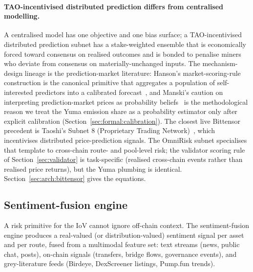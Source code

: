\documentclass[11pt,a4paper]{article}
\begin{document}
\paragraph{TAO-incentivised distributed prediction differs from centralised
modelling.} A centralised model has one objective and one bias surface; a TAO-incentivised
distributed prediction subnet has a stake-weighted ensemble that is economically
forced toward consensus on realised outcomes and is bonded to penalise miners who
deviate from consensus on materially-unchanged inputs. The mechanism-design lineage
is the prediction-market literature: Hanson's market-scoring-rule construction is
the canonical primitive that aggregates a population of self-interested predictors
into a calibrated forecast~\cite{hanson2003combinatorial}, and Manski's caution on
interpreting prediction-market prices as probability beliefs~\cite{manski2006interpreting}
is the methodological reason we treat the Yuma emission share as a probability
estimator only after explicit calibration (Section~\ref{sec:formal:calibration}).
The closest live Bittensor precedent is Taoshi's Subnet 8 (Proprietary Trading
Network)~\cite{taoshi2024ptn}, which incentivises distributed price-prediction
signals. The OmniRisk subnet specialises that template to cross-chain route- and
pool-level risk; the validator scoring rule of Section~\ref{sec:validator} is
task-specific (realised cross-chain events rather than realised price returns), but
the Yuma plumbing is identical. Section~\ref{sec:arch:bittensor} gives the
equations.

\subsection{Sentiment-fusion engine}\label{sec:engine:sentiment}

A risk primitive for the IoV cannot ignore off-chain context. The
sentiment-fusion engine produces a real-valued (or distribution-valued) sentiment
signal per asset and per route, fused from a multimodal feature set: text streams
(news, public chat, posts), on-chain signals (transfers, bridge flows, governance
events), and grey-literature feeds (Birdeye, DexScreener listings, Pump.fun trends).
\end{document}
